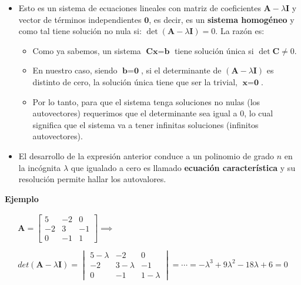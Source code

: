 \documentclass[openany]{book}
\providecommand{\tightlist}{%
  \setlength{\itemsep}{0pt}\setlength{\parskip}{0pt}}
\begin{document}
\begin{itemize}
\item
  Esto es un sistema de ecuaciones lineales con matriz de coeficientes \(\textbf{A} - \lambda \textbf{I}\) y vector de términos independientes \(\textbf{0}\), es decir, es un \textbf{sistema homogéneo} y como tal tiene solución no nula si: \(\det (\textbf{A} - \lambda \textbf{I}) = 0\). La razón es:

  \begin{itemize}
  \tightlist
  \item
    Como ya sabemos, un sistema \(\textbf{Cx} = \textbf{b}\) tiene solución única si \(\det \textbf{C} \neq 0\).
  \item
    En nuestro caso, siendo \(\textbf{b} = \textbf{0}\), si el determinante de \((\textbf{A} - \lambda \textbf{I})\) es distinto de cero, la solución única tiene que ser la trivial, \(\textbf{x} = \textbf{0}\).
  \item
    Por lo tanto, para que el sistema tenga soluciones no nulas (los autovectores) requerimos que el determinante sea igual a 0, lo cual significa que el sistema va a tener infinitas soluciones (infinitos autovectores).
  \end{itemize}
\item
  El desarrollo de la expresión anterior conduce a un polinomio de grado \(n\) en la incógnita \(\lambda\) que igualado a cero es llamado \textbf{ecuación característica} y su resolución permite hallar los autovalores.
\end{itemize}

\textbf{Ejemplo}

\begin{gather*}
\mathbf{A} = 
\begin{bmatrix} 
    5 & -2 & 0 \\ 
    -2 & 3 & -1 \\
    0 & -1 & 1    
\end{bmatrix} 
\implies \\ \\
 det(\textbf{A} - \lambda \textbf{I}) = 
\begin{vmatrix}
    5 - \lambda & -2 & 0 \\ 
    -2 & 3 - \lambda & -1 \\
    0 & -1 & 1-\lambda
\end{vmatrix}  = 
\cdots  = -\lambda^3 + 9 \lambda^2 - 18 \lambda + 6 = 0
\end{gather*}
\end{document}
